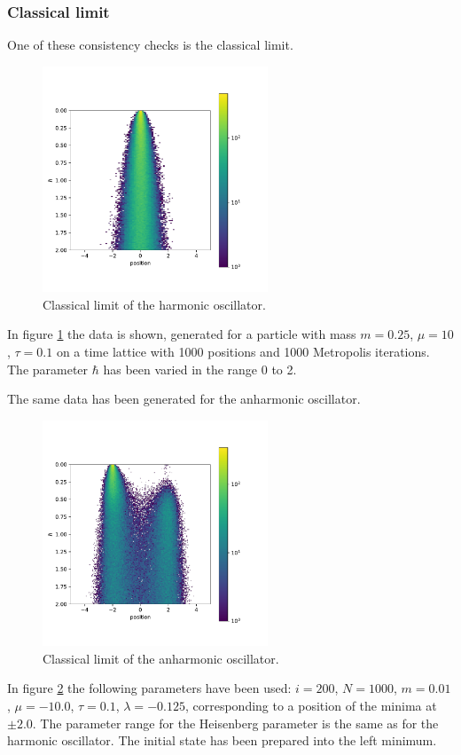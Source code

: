 \documentclass{scrartcl}
\begin{document}
	\subsubsection{Classical limit}
		One of these consistency checks is the classical limit.
		\begin{figure}[H]
			\centering
				\includegraphics[width=0.6\textwidth]{../imgs/harmonic_oscillator_classical_limit/harmonic_oscillator_10_classical_limit.pdf}
			\caption{Classical limit of the harmonic oscillator.}
			\label{fig:harmonic_oscillator_classical_limit}
		\end{figure}
		In figure \ref{fig:harmonic_oscillator_classical_limit} the data is shown, generated for a particle with mass $m = 0.25$, $\mu = 10$, $\tau = 0.1$ on a time lattice with 1000 positions and 1000 Metropolis iterations.
		The parameter $\hbar$ has been varied in the range 0 to 2.

		The same data has been generated for the anharmonic oscillator.
		\begin{figure}[H]
			\centering
				\includegraphics[width=0.6\textwidth]{../imgs/anharmonic_oscillator_classical_limit/anharmonic_oscillator_classical_limit.pdf}
			\caption{Classical limit of the anharmonic oscillator.}
			\label{fig:anharmonic_oscillator_classical_limit}
		\end{figure}
		In figure \ref{fig:anharmonic_oscillator_classical_limit} the following parameters have been used: $i = 200$, $N = 1000$, $m = 0.01$, $\mu = -10.0$, $\tau = 0.1$, $\lambda = -0.125$, corresponding to a position of the minima at $\pm 2.0$.
		The parameter range for the Heisenberg parameter is the same as for the harmonic oscillator.
		The initial state has been prepared into the left minimum.
\end{document}
